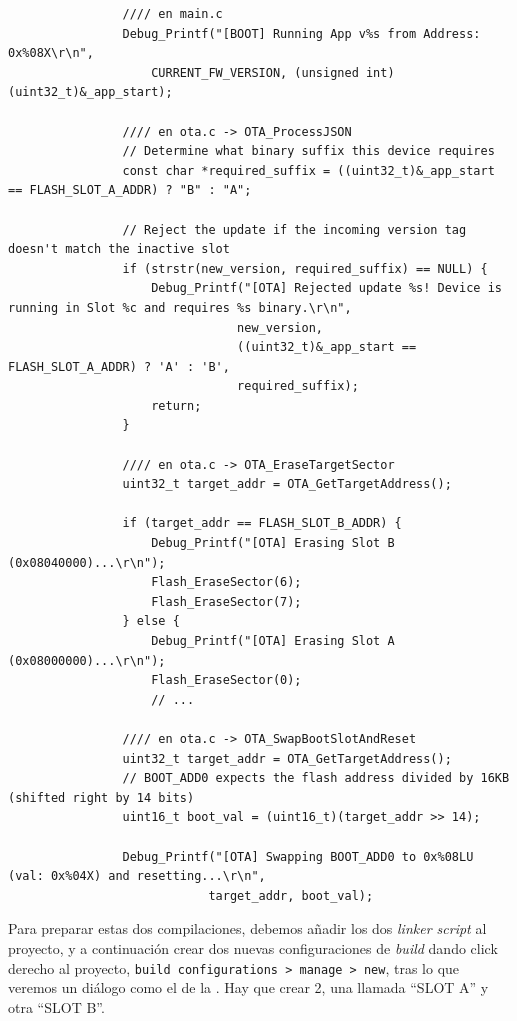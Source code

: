 \documentclass[../main.tex]{subfiles}
\begin{document}
            \begin{lstlisting}
                //// en main.c
                Debug_Printf("[BOOT] Running App v%s from Address: 0x%08X\r\n",
                    CURRENT_FW_VERSION, (unsigned int)(uint32_t)&_app_start);

                //// en ota.c -> OTA_ProcessJSON
                // Determine what binary suffix this device requires
    	        const char *required_suffix = ((uint32_t)&_app_start == FLASH_SLOT_A_ADDR) ? "B" : "A";

                // Reject the update if the incoming version tag doesn't match the inactive slot
                if (strstr(new_version, required_suffix) == NULL) {
                    Debug_Printf("[OTA] Rejected update %s! Device is running in Slot %c and requires %s binary.\r\n",
                                new_version,
                                ((uint32_t)&_app_start == FLASH_SLOT_A_ADDR) ? 'A' : 'B',
                                required_suffix);
                    return;
                }

                //// en ota.c -> OTA_EraseTargetSector
                uint32_t target_addr = OTA_GetTargetAddress();

                if (target_addr == FLASH_SLOT_B_ADDR) {
                    Debug_Printf("[OTA] Erasing Slot B (0x08040000)...\r\n");
                    Flash_EraseSector(6);
                    Flash_EraseSector(7);
                } else {
                    Debug_Printf("[OTA] Erasing Slot A (0x08000000)...\r\n");
                    Flash_EraseSector(0);
                    // ...

                //// en ota.c -> OTA_SwapBootSlotAndReset
                uint32_t target_addr = OTA_GetTargetAddress();
                // BOOT_ADD0 expects the flash address divided by 16KB (shifted right by 14 bits)
                uint16_t boot_val = (uint16_t)(target_addr >> 14);

                Debug_Printf("[OTA] Swapping BOOT_ADD0 to 0x%08LU (val: 0x%04X) and resetting...\r\n",
                            target_addr, boot_val);
            \end{lstlisting}

            Para preparar estas dos compilaciones, debemos añadir los dos \emph{linker script} al proyecto, y a continuación crear dos nuevas configuraciones de \emph{build} dando click derecho al proyecto, \texttt{build configurations > manage > new}, tras lo que veremos un diálogo como el de la . Hay que crear 2, una llamada ``SLOT A'' y otra ``SLOT B''.
\end{document}
